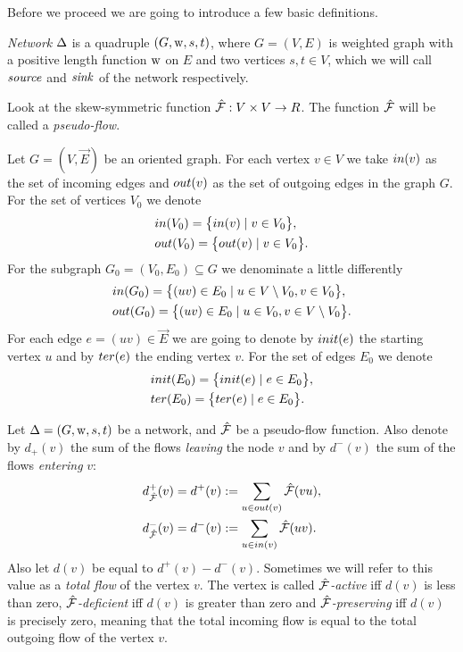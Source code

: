 \documentclass[12pt]{article}
\begin{document}
    Before we proceed we are going to introduce a few basic definitions.
    \begin{definition}
        \emph{Network} $\Delta$ is a quadruple $(G, \mathrm{w}, s, t)$, where $G = (V, E)$ is weighted graph
        with a positive length function $\mathrm{w}$ on $E$ and two vertices $s, t \in V$, which
        we will call $\mathit{source}$ and $\mathit{sink}$ of the network respectively.
    \end{definition}
    \begin{definition}
        Look at the skew-symmetric function $\mathcal{\hat{F}}: V \times V \to R$.
        The function $\mathcal{\hat{F}}$ will be called a \emph{pseudo-flow}.
    \end{definition}
    \begin{definition}
      Let $G = (V, \vec{E})$ be an oriented graph.
      For each vertex $v \in V$ we take $in(v)$ as the set of incoming edges
      and $out(v)$ as the set of outgoing edges in the graph $G$.
      For the set of vertices $V_0$ we denote
      \begin{align*}
        &in(V_0) = \big\{in(v) \mid v\in V_0\big\},\\
        &out(V_0) = \big\{out(v) \mid v\in V_0\big\}.
      \end{align*}
      For the subgraph $G_0 = (V_0, E_0) \subseteq G$ we denominate a little differently
      \begin{align*}
        &in(G_0) = \big\{(uv)\in E_0 \mid u \in V \setminus V_0, v \in V_0\big\},\\
        &out(G_0) = \big\{(uv) \in E_0 \mid u \in V_0, v \in V\setminus V_0\big\}.
      \end{align*}
      For each edge $e=(uv) \in \vec{E}$ we are going to denote by $init(e)$ the starting vertex
      $u$ and by $ter(e)$ the ending vertex $v$.
      For the set of edges $E_0$ we denote
      \begin{align*}
        &init(E_0) = \big\{init(e) \mid e\in E_0\big\},\\
        &ter(E_0) = \big\{ter(e) \mid e\in E_0\big\}.
      \end{align*}
    \end{definition}
    \begin{definition}
      Let $\Delta = (G, \mathrm{w}, s, t)$ be a network, and $\mathcal{\hat{F}}$ be a pseudo-flow function.
      Also denote by $d_{+}(v)$ the sum of the flows \emph{leaving} the node $v$ and by
      $d^{-}(v)$ the sum of the flows \emph{entering} $v$:
      \begin{align*}
        &d^{+}_{\mathcal{\hat{F}}}(v) = d^{+}(v) := \sum_{u \in out(v)} \mathcal{\hat{F}}(vu),\\
        &d^{-}_{\mathcal{\hat{F}}}(v) = d^{-}(v) := \sum_{u \in in(v)} \mathcal{\hat{F}}(uv).
      \end{align*}
      Also let $d(v)$ be equal to $d^{+}(v) - d^{-}(v)$. Sometimes we will refer to this value as
      a \emph{total flow} of the vertex $v$.
      The vertex is called \emph{$\mathcal{\hat{F}}$-active} iff $d(v)$ is less than zero,
      \emph{$\mathcal{\hat{F}}$-deficient} iff $d(v)$ is greater than zero and
      \emph{$\mathcal{\hat{F}}$-preserving} iff $d(v)$ is precisely zero, meaning that the total incoming flow
      is equal to the total outgoing flow of the vertex $v$.
    \end{definition}
\end{document}
